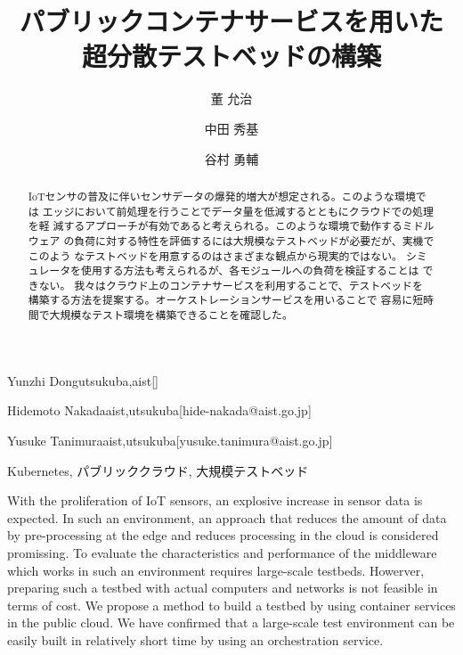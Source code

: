 \documentclass[submit,techrep]{ipsj}
\newcommand{\kbs}{Kubernetes}
\begin{document}
\title{パブリックコンテナサービスを用いた\\超分散テストベッドの構築}




\author{董 允治}{Yunzhi Dong}{utsukuba,aist}[]
\author{中田 秀基}{Hidemoto Nakada}{aist,utsukuba}[hide-nakada@aist.go.jp]
\author{谷村 勇輔}{Yusuke Tanimura}{aist,utsukuba}[yusuke.tanimura@aist.go.jp]


\begin{abstract}
  IoTセンサの普及に伴いセンサデータの爆発的増大が想定される。このような環境では
  エッジにおいて前処理を行うことでデータ量を低減するとともにクラウドでの処理を軽
  減するアプローチが有効であると考えられる。このような環境で動作するミドルウェア
  の負荷に対する特性を評価するには大規模なテストベッドが必要だが、実機でこのよう
  なテストベッドを用意するのはさまざまな観点から現実的ではない。
  シミュレータを使用する方法も考えられるが、各モジュールへの負荷を検証することは
  できない。
  我々はクラウド上のコンテナサービスを利用することで、テストベッドを
  構築する方法を提案する。オーケストレーションサービスを用いることで
  容易に短時間で大規模なテスト環境を構築できることを確認した。
\end{abstract}

\begin{jkeyword}
  \kbs, パブリッククラウド, 大規模テストベッド
\end{jkeyword}

\begin{eabstract}
  With the proliferation of IoT sensors,
  an explosive increase in sensor data is expected. 
  In such an environment, an approach that reduces the amount of 
  data by pre-processing at the edge and reduces processing 
  in the cloud is considered promissing.
  To evaluate the characteristics and performance of the middleware
  which works in such an environment requires large-scale testbeds.
  Howerver, preparing such a testbed with actual computers and networks 
  is not feasible in terms of cost.
  We propose a method to build a testbed by using container services in the public cloud.
  We have confirmed that a large-scale test environment 
  can be easily built in relatively short time 
  by using an orchestration service.
\end{eabstract}
\end{document}
